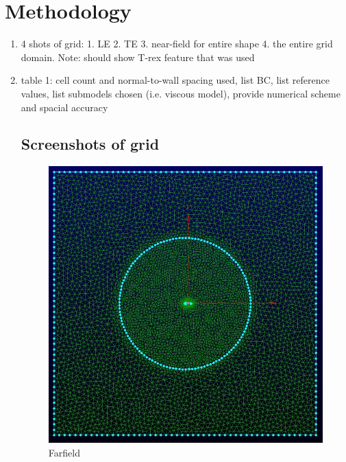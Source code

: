 \section{Methodology}

\begin{enumerate}
	\item 4 shots of grid: 1. LE 2. TE 3. near-field for entire shape 4. the entire grid domain. Note: should show T-rex feature that was used
	\item table 1: cell count and normal-to-wall spacing used, list BC, list reference values, list submodels chosen (i.e. viscous model), provide numerical scheme and spacial accuracy
	
\subsection{Screenshots of grid}

\begin{figure}[ht]
	\centering
	\includegraphics[width=\textwidth]{general_images/farfield}
	\caption{Farfield}
\label{fig:farfield}
\end{figure}


\end{enumerate}
